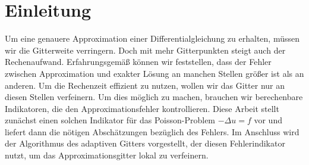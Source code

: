 \chapter{Einleitung}
\renewcommand{\thepage}{\arabic{page}}
\setcounter{page}{1}
Um eine genauere Approximation einer Differentialgleichung zu erhalten, müssen wir die Gitterweite verringern. Doch mit mehr Gitterpunkten steigt auch der Rechenaufwand. Erfahrungsgemäß können wir feststellen, dass der Fehler zwischen Approximation und exakter Lösung an manchen Stellen größer ist als an anderen. Um die Rechenzeit effizient zu nutzen, wollen wir das Gitter nur an diesen Stellen verfeinern. Um dies möglich zu machen, brauchen wir berechenbare Indikatoren, die den Approximationsfehler kontrollieren. Diese Arbeit stellt zunächst einen solchen Indikator für das Poisson-Problem $-\Delta u =f$ vor und liefert dann die nötigen Abschätzungen bezüglich des Fehlers. Im Anschluss wird der Algorithmus des adaptiven Gitters vorgestellt, der diesen Fehlerindikator nutzt, um das Approximationsgitter lokal zu verfeinern.